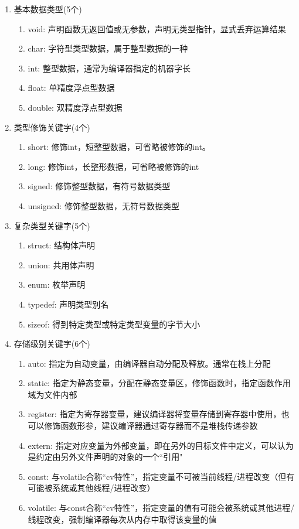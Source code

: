 \begin{enumerate}[label=\arabic*)]
	\item 基本数据类型(5个)
	\begin{enumerate}
		\item void: 声明函数无返回值或无参数，声明无类型指针，显式丢弃运算结果
		\item char: 字符型类型数据，属于整型数据的一种
		\item int: 整型数据，通常为编译器指定的机器字长
		\item float: 单精度浮点型数据
		\item double: 双精度浮点型数据
	\end{enumerate}
	\item 类型修饰关键字(4个)
	\begin{enumerate}
		\item short: 修饰int，短整型数据，可省略被修饰的int。
		\item long: 修饰int，长整形数据，可省略被修饰的int
		\item signed: 修饰整型数据，有符号数据类型
		\item unsigned: 修饰整型数据，无符号数据类型
	\end{enumerate}
	\item 复杂类型关键字(5个)
	\begin{enumerate}
		\item struct: 结构体声明
		\item union: 共用体声明
		\item enum: 枚举声明
		\item typedef: 声明类型别名
		\item sizeof: 得到特定类型或特定类型变量的字节大小
	\end{enumerate}
	\item 存储级别关键字(6个)
	\begin{enumerate}
		\item auto: 指定为自动变量，由编译器自动分配及释放。通常在栈上分配
		\item static: 指定为静态变量，分配在静态变量区，修饰函数时，指定函数作用域为文件内部
		\item register: 指定为寄存器变量，建议编译器将变量存储到寄存器中使用，也可以修饰函数形参，建议编译器通过寄存器而不是堆栈传递参数
		\item extern: 指定对应变量为外部变量，即在另外的目标文件中定义，可以认为是约定由另外文件声明的对象的一个``引用"
		\item const: 与volatile合称“cv特性”，指定变量不可被当前线程/进程改变（但有可能被系统或其他线程/进程改变）
		\item volatile: 与const合称“cv特性”，指定变量的值有可能会被系统或其他进程/线程改变，强制编译器每次从内存中取得该变量的值
	\end{enumerate}	
\end{enumerate}


   




